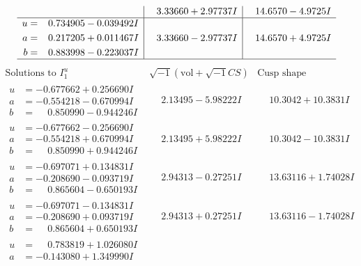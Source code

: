\documentclass[1p]{elsarticle_modified}
\theoremstyle{definition}
\newcommand{\I}{\sqrt{-1}}
\begin{document}
$$\begin{array}{c|c|c}
 & \phantom{-}3.33660 + 2.97737 I & \phantom{-}14.6570 - 4.9725 I \\ \hline\begin{aligned}
u &= \phantom{-}0.734905 - 0.039492 I \\
a &= \phantom{-}0.217205 + 0.011467 I \\
b &= \phantom{-}0.883998 - 0.223037 I\end{aligned}
 & \phantom{-}3.33660 - 2.97737 I & \phantom{-}14.6570 + 4.9725 I\\
 \hline 
 \end{array}$$\newpage$$\begin{array}{c|c|c}  
\text{Solutions to }I^u_{1}& \I (\text{vol} + \sqrt{-1}CS) & \text{Cusp shape}\\
 \hline 
\begin{aligned}
u &= -0.677662 + 0.256690 I \\
a &= -0.554218 - 0.670994 I \\
b &= \phantom{-}0.850990 - 0.944246 I\end{aligned}
 & \phantom{-}2.13495 - 5.98222 I & \phantom{-}10.3042 + 10.3831 I \\ \hline\begin{aligned}
u &= -0.677662 - 0.256690 I \\
a &= -0.554218 + 0.670994 I \\
b &= \phantom{-}0.850990 + 0.944246 I\end{aligned}
 & \phantom{-}2.13495 + 5.98222 I & \phantom{-}10.3042 - 10.3831 I \\ \hline\begin{aligned}
u &= -0.697071 + 0.134831 I \\
a &= -0.208690 - 0.093719 I \\
b &= \phantom{-}0.865604 - 0.650193 I\end{aligned}
 & \phantom{-}2.94313 - 0.27251 I & \phantom{-}13.63116 + 1.74028 I \\ \hline\begin{aligned}
u &= -0.697071 - 0.134831 I \\
a &= -0.208690 + 0.093719 I \\
b &= \phantom{-}0.865604 + 0.650193 I\end{aligned}
 & \phantom{-}2.94313 + 0.27251 I & \phantom{-}13.63116 - 1.74028 I \\ \hline\begin{aligned}
u &= \phantom{-}0.783819 + 1.026080 I \\
a &= -0.143080 + 1.349990 I \\

\end{aligned}
\end{array}$$
\end{document}
